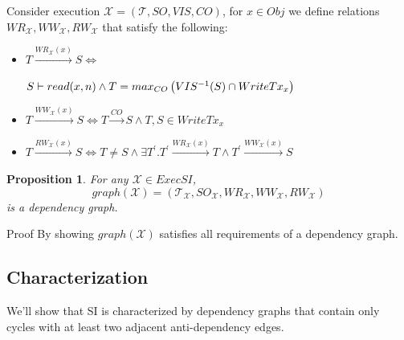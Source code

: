 \documentclass{beamer}
\newtheorem*{prop}{Proposition}
\begin{document}
\begin{frame}
	\begin{definition}
		Consider execution $\mathcal{X} = (\mathcal{T}, SO, VIS, CO)$, for $x \in Obj$ we define relations $WR_\mathcal{X}, WW_\mathcal{X}, RW_\mathcal{X}$ that satisfy the following:
		\begin{itemize}
			\item 
					$
					T \xrightarrow{WR_\mathcal{X}(x)} S \Leftrightarrow 
					$
					
					$\hfill
					S \vdash read(x,n) \wedge T = max_{CO}\left( VIS^{-1}(S) \cap WriteTx_x \right)
					$
			\item
				$
				T \xrightarrow{WW_\mathcal{X}(x)} S \Leftrightarrow T \xrightarrow{CO}S \wedge T,S \in WriteTx_x
				$
			\item 
				$
				T \xrightarrow{RW_\mathcal{X}(x)} S \Leftrightarrow
				T \ne S \wedge \exists T^\prime . T^\prime \xrightarrow{WR_\mathcal{X}(x)}T \wedge T^\prime \xrightarrow{WW_\mathcal{X}(x)}S
				$
		\end{itemize}
	\end{definition}\end{frame}


\begin{frame}
	\begin{prop}
		For any $\mathcal{X} \in ExecSI$,
		$$
			graph(\mathcal{X}) = (\mathcal{T}_\mathcal{X}, SO_\mathcal{X}, WR_\mathcal{X}, WW_\mathcal{X}, RW_\mathcal{X})
		$$
		is a dependency graph.
	\end{prop}
	\begin{block}{Proof}
		By showing $graph(\mathcal{X})$ satisfies all requirements of a dependency graph.
	\end{block}
\end{frame}

\subsection{Characterization}

\begin{frame}
	We'll show that SI is characterized by dependency graphs that contain only cycles with at least two adjacent anti-dependency edges.
\end{frame}
\end{document}
